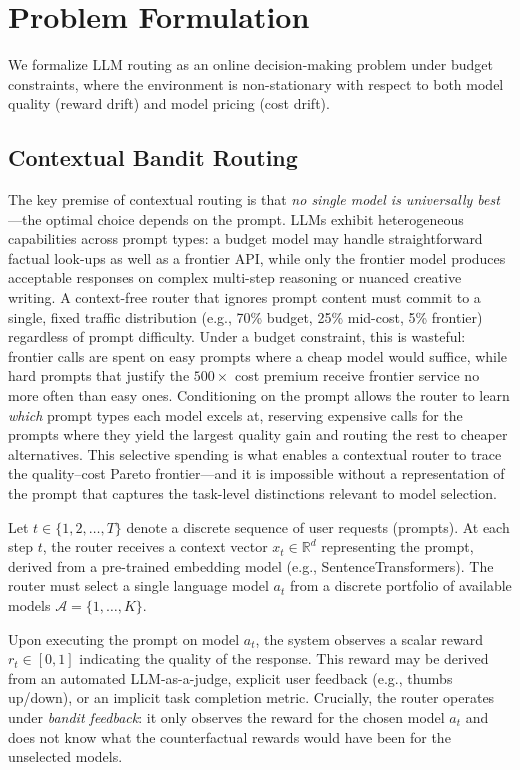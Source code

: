 \section{Problem Formulation}
\label{sec:problem}

We formalize LLM routing as an online decision-making problem under budget constraints, where the environment is non-stationary with respect to both model quality (reward drift) and model pricing (cost drift). 

\subsection{Contextual Bandit Routing}

The key premise of contextual routing is that \emph{no single model is universally best}---the optimal choice depends on the prompt.
LLMs exhibit heterogeneous capabilities across prompt types: a budget model may handle straightforward factual look-ups as well as a frontier API, while only the frontier model produces acceptable responses on complex multi-step reasoning or nuanced creative writing.
A context-free router that ignores prompt content must commit to a single, fixed traffic distribution (e.g., 70\% budget, 25\% mid-cost, 5\% frontier) regardless of prompt difficulty.
Under a budget constraint, this is wasteful: frontier calls are spent on easy prompts where a cheap model would suffice, while hard prompts that justify the $500{\times}$ cost premium receive frontier service no more often than easy ones.
Conditioning on the prompt allows the router to learn \emph{which} prompt types each model excels at, reserving expensive calls for the prompts where they yield the largest quality gain and routing the rest to cheaper alternatives.
This selective spending is what enables a contextual router to trace the quality--cost Pareto frontier---and it is impossible without a representation of the prompt that captures the task-level distinctions relevant to model selection.

Let $t \in \{1, 2, \ldots, T\}$ denote a discrete sequence of user requests (prompts). At each step $t$, the router receives a context vector $x_t \in \mathbb{R}^d$ representing the prompt, derived from a pre-trained embedding model (e.g., SentenceTransformers). The router must select a single language model $a_t$ from a discrete portfolio of available models $\mathcal{A} = \{1, \dots, K\}$. 

Upon executing the prompt on model $a_t$, the system observes a scalar reward $r_t \in [0, 1]$ indicating the quality of the response. This reward may be derived from an automated LLM-as-a-judge, explicit user feedback (e.g., thumbs up/down), or an implicit task completion metric. Crucially, the router operates under \emph{bandit feedback}: it only observes the reward for the chosen model $a_t$ and does not know what the counterfactual rewards would have been for the unselected models.


